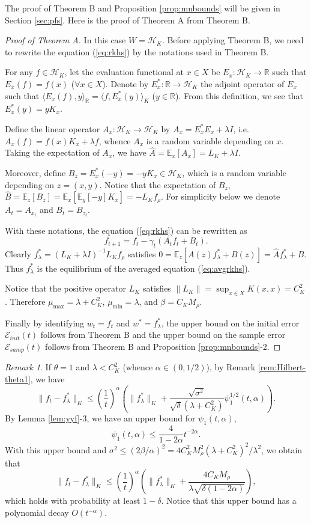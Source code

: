 \documentclass[twoside]{amsart}
\theoremstyle{theorem}
\theoremstyle{definition}
\theoremstyle{remark}
\newtheorem{rem}[thm]{Remark}
\def\H{{\mathscr H}}
\def\Err{{\mathscr E}}
\def\amax{{\mu_{\max}}}
\def\amin{{\mu_{\min}} }
\def\R{{\mathbb R}}        %
\def\E{{\mathbb E}}        %
\def\<{{\langle}}
\def\>{{\rangle}}
\begin{document}
The proof of Theorem B and Proposition \ref{prop:mnbounds} will be given in Section \ref{sec:pfs}.
Here is the proof of Theorem A from Theorem B.

\begin{proof}[Proof of Theorem A] In this case $W=\H_K$. Before applying Theorem B,
we need to rewrite the equation (\ref{eq:rkhs}) by the
notations used in Theorem B.

For any $f\in \H_K$, let the evaluation functional at $x\in X$ be $E_x:\H_K\to \R$ such that $E_x(f)=f(x)$ ($\forall x\in X$).
Denote by $E^\ast_x:\R\to \H_K$ the
adjoint operator of $E_x$ such that $\<E_x(f),y\>_{\R} = \<f,E^\ast_x(y)\>_K$ ($y\in \R$).
From this definition, we see that $E^\ast_x(y)=y K_x$.

Define the linear operator $A_x: \H_K\to \H_K$ by $A_x=E^\ast_x E_x + \lambda I$, i.e. $A_x(f)=f(x)K_x + \lambda f$, whence $A_x$ is a random variable
depending on $x$. Taking the expectation of $A_x$, we have $\hat{A}=\E_x[A_x]=L_K + \lambda I$.

Moreover, define $B_z= E^\ast_x(-y)= - y K_x \in \H_K$, which is a random variable
depending on $z=(x,y)$. Notice that the expectation of $B_z$, $\hat{B}=\E_z[B_z]=\E_x [ \E_y[-y]K_x] = -L_K f_\rho$.
For simplicity below we denote $A_t=A_{x_t}$ and $B_t=B_{z_t}$.

With these notations, the equation (\ref{eq:rkhs}) can be rewritten as
\[ f_{t+1}=f_t - \gamma_t ( A_t f_t + B_t). \]
Clearly $f^\ast_\lambda=(L_K+\lambda I)^{-1} L_K f_\rho$ satisfies $0 = \E_z[A(z) f^\ast_\lambda + B(z)] =\hat{A} f^\ast_\lambda +\hat{B}$.
Thus $f^\ast_\lambda$ is the equilibrium of the averaged equation (\ref{eq:avgrkhs}).

Notice that the positive operator $L_K$ satisfies $\|L_K\|=\sup_{x\in X} K(x,x)=C_K^2$.
Therefore $\amax= \lambda + C_K^2$, $\amin=\lambda$, and $\beta= C_K M_{\rho}$.

Finally by identifying $w_t=f_t$ and $w^\ast=f^\ast_\lambda$, the upper bound on the initial error $\Err_{init}(t)$ follows from Theorem B
and the upper bound on the sample error $\Err_{samp}(t)$ follows from Theorem B and Proposition \ref{prop:mnbounds}-2.
\end{proof}

\begin{rem} \label{rem:RKHS-theta1}
If $\theta=1$ and $\lambda<C^2_K$ (whence $\alpha\in (0,1/2)$), by Remark \ref{rem:Hilbert-theta1}, we have
\[ \|f_t - f^\ast_\lambda \|_K \leq  \left( \frac{1}{t} \right)^{\alpha}
\left(\|f^\ast_\lambda\|_K + \frac{\sqrt{\sigma^2}}{\sqrt{\delta}(\lambda+C^2_K)} \psi^{1/2}_1(t,\alpha)\right). \]
By Lemma \ref{lem:yyf}-3, we have an upper bound for $\psi_1(t,\alpha)$,
\[ \psi_1(t,\alpha) \leq  \frac{4}{1-2\alpha} t^{-2\alpha}. \]
With this upper bound and $\sigma^2 \leq (2 \beta/\alpha)^2 = 4 C_K^2 M_\rho^2 (\lambda+ C^2_K)^2/\lambda^2$, we obtain that
\[ \|f_t - f^\ast_\lambda \|_K \leq \left( \frac{1}{t} \right)^{\alpha}
\left(\|f^\ast_\lambda \|_K+ \frac{4C_K M_\rho }{\lambda\sqrt{\delta(1-2\alpha)}}\right), \]
which holds with probability at least $1-\delta$.
Notice that this upper bound has a polynomial decay $O(t^{-\alpha})$.
\end{rem}
\end{document}
